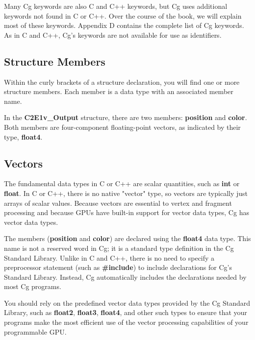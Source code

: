 \documentclass[../main.tex]{subfiles}
\begin{document}
Many Cg keywords are also C and C++ keywords, but Cg uses additional keywords not found in C or C++. Over the course of the book, we will explain most of these keywords. Appendix D contains the complete list of Cg keywords. As in C and C++, Cg's keywords are not available for use as identifiers.

\subsection{Structure Members}

Within the curly brackets of a structure declaration, you will find one or more structure members. Each member is a data type with an associated member name.

In the \textbf{C2E1v_Output} structure, there are two members: \textbf{position} and \textbf{color}. Both members are four-component floating-point vectors, as indicated by their type, \textbf{float4}.

\subsection{Vectors}

The fundamental data types in C or C++ are scalar quantities, such as \textbf{int} or \textbf{float}. In C or C++, there is no native "vector" type, so vectors are typically just arrays of scalar values. Because vectors are essential to vertex and fragment processing and because GPUs have built-in support for vector data types, Cg has vector data types.

The members (\textbf{position} and \textbf{color}) are declared using the \textbf{float4} data type. This name is not a reserved word in Cg; it is a standard type definition in the Cg Standard Library. Unlike in C and C++, there is no need to specify a preprocessor statement (such as \textbf{\#include}) to include declarations for Cg's Standard Library. Instead, Cg automatically includes the declarations needed by most Cg programs.

You should rely on the predefined vector data types provided by the Cg Standard Library, such as \textbf{float2}, \textbf{float3}, \textbf{float4}, and other such types to ensure that your programs make the most efficient use of the vector processing capabilities of your programmable GPU.
\end{document}
